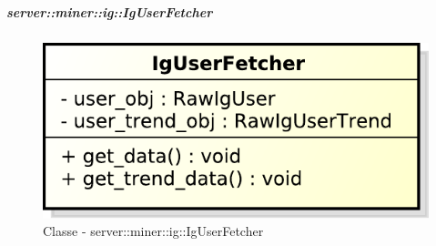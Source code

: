 	\subparagraph{server::miner::ig::IgUserFetcher} %
		\label{subp:server_miner_ig_IgUserFetcher}
		    \begin{figure}[!htbp]
 		 		\centering
 				\centerline{\includegraphics[scale=0.75]{./images/server/classes/miner/ig_user_fetcher.pdf}}
 				\caption{Classe - server::miner::ig::IgUserFetcher}
			\end{figure}
